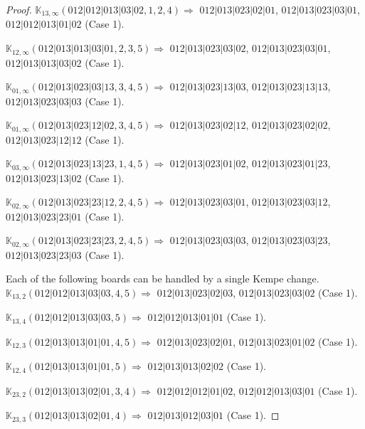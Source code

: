 \documentclass[12pt]{article}
\newcommand{\K}{\mathbb{K}}
\begin{document}
\begin{proof}
\bigskip

$\K_{13,\infty}(012|012|013|03|02,1, 2, 4)\Rightarrow $ $012|013|023|02|01$, $012|013|023|03|01$, $012|012|013|01|02$ (Case 1).

\bigskip

$\K_{12,\infty}(012|013|013|03|01,2, 3, 5)\Rightarrow $ $012|013|023|03|02$, $012|013|023|03|01$, $012|013|013|03|02$ (Case 1).

\bigskip

$\K_{01,\infty}(012|013|023|03|13,3, 4, 5)\Rightarrow $ $012|013|023|13|03$, $012|013|023|13|13$, $012|013|023|03|03$ (Case 1).

\bigskip

$\K_{01,\infty}(012|013|023|12|02,3, 4, 5)\Rightarrow $ $012|013|023|02|12$, $012|013|023|02|02$, $012|013|023|12|12$ (Case 1).

\bigskip

$\K_{03,\infty}(012|013|023|13|23,1, 4, 5)\Rightarrow $ $012|013|023|01|02$, $012|013|023|01|23$, $012|013|023|13|02$ (Case 1).

\bigskip

$\K_{02,\infty}(012|013|023|23|12,2, 4, 5)\Rightarrow $ $012|013|023|03|01$, $012|013|023|03|12$, $012|013|023|23|01$ (Case 1).

\bigskip

$\K_{02,\infty}(012|013|023|23|23,2, 4, 5)\Rightarrow $ $012|013|023|03|03$, $012|013|023|03|23$, $012|013|023|23|03$ (Case 1).

\bigskip

\bigskip

Each of the following boards can be handled by a single Kempe change.
$\K_{13,2}(012|012|013|03|03,4, 5)\Rightarrow $ $012|013|023|02|03$, $012|013|023|03|02$ (Case 1).

$\K_{13,4}(012|012|013|03|03,5)\Rightarrow $ $012|012|013|01|01$ (Case 1).


\bigskip

$\K_{12,3}(012|013|013|01|01,4, 5)\Rightarrow $ $012|013|023|02|01$, $012|013|023|01|02$ (Case 1).

$\K_{12,4}(012|013|013|01|01,5)\Rightarrow $ $012|013|013|02|02$ (Case 1).


\bigskip

$\K_{23,2}(012|013|013|02|01,3, 4)\Rightarrow $ $012|012|012|01|02$, $012|012|013|03|01$ (Case 1).

$\K_{23,3}(012|013|013|02|01,4)\Rightarrow $ $012|013|012|03|01$ (Case 1).


\bigskip


\end{proof}
\end{document}
